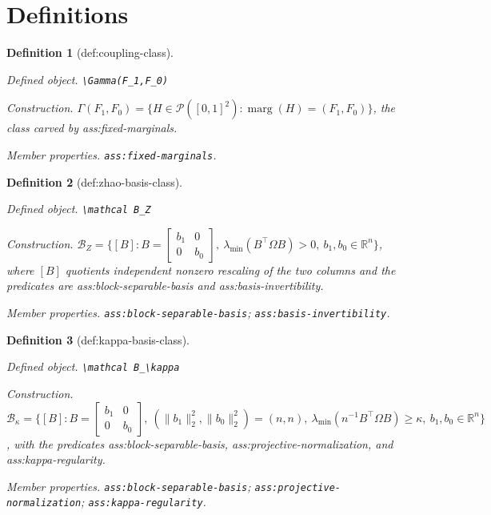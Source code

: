 \documentclass{article}
\newtheorem{definition}{Definition}
\begin{document}
\section{Definitions}

\begin{definition}[def:coupling-class]\label{def:coupling-class}
\par\smallskip\noindent\emph{Defined object.} \texttt{\textbackslash{}\allowbreak{}Gamma(F\_\allowbreak{}1,\allowbreak{}F\_\allowbreak{}0)}
\par\smallskip\noindent\emph{Construction.} \(\Gamma(F_1,F_0)=\{H\in\mathcal P([0,1]^2):\operatorname{marg}(H)=(F_1,F_0)\}\), the class carved by ass:fixed-marginals.
\par\smallskip\noindent\emph{Member properties.} \texttt{ass:\allowbreak{}fixed-\allowbreak{}marginals}.
\end{definition}

\begin{definition}[def:zhao-basis-class]\label{def:zhao-basis-class}
\par\smallskip\noindent\emph{Defined object.} \texttt{\textbackslash{}\allowbreak{}mathcal B\_\allowbreak{}Z}
\par\smallskip\noindent\emph{Construction.} \(\mathcal B_Z=\{[B]:B=\begin{bmatrix}b_1&0\\0&b_0\end{bmatrix},\ \lambda_{\min}(B^{\top}\Omega B)>0,\ b_1,b_0\in\mathbb R^n\}\), where \([B]\) quotients independent nonzero rescaling of the two columns and the predicates are ass:block-separable-basis and ass:basis-invertibility.
\par\smallskip\noindent\emph{Member properties.} \texttt{ass:\allowbreak{}block-\allowbreak{}separable-\allowbreak{}basis}; \texttt{ass:\allowbreak{}basis-\allowbreak{}invertibility}.
\end{definition}

\begin{definition}[def:kappa-basis-class]\label{def:kappa-basis-class}
\par\smallskip\noindent\emph{Defined object.} \texttt{\textbackslash{}\allowbreak{}mathcal B\_\allowbreak{}\textbackslash{}\allowbreak{}kappa}
\par\smallskip\noindent\emph{Construction.} \(\mathcal B_\kappa=\{[B]:B=\begin{bmatrix}b_1&0\\0&b_0\end{bmatrix},\ (\lVert b_1\rVert_2^2,\lVert b_0\rVert_2^2)=(n,n),\ \lambda_{\min}(n^{-1}B^{\top}\Omega B)\ge\kappa,\ b_1,b_0\in\mathbb R^n\}\), with the predicates ass:block-separable-basis, ass:projective-normalization, and ass:kappa-regularity.
\par\smallskip\noindent\emph{Member properties.} \texttt{ass:\allowbreak{}block-\allowbreak{}separable-\allowbreak{}basis}; \texttt{ass:\allowbreak{}projective-\allowbreak{}normalization}; \texttt{ass:\allowbreak{}kappa-\allowbreak{}regularity}.
\end{definition}
\end{document}

